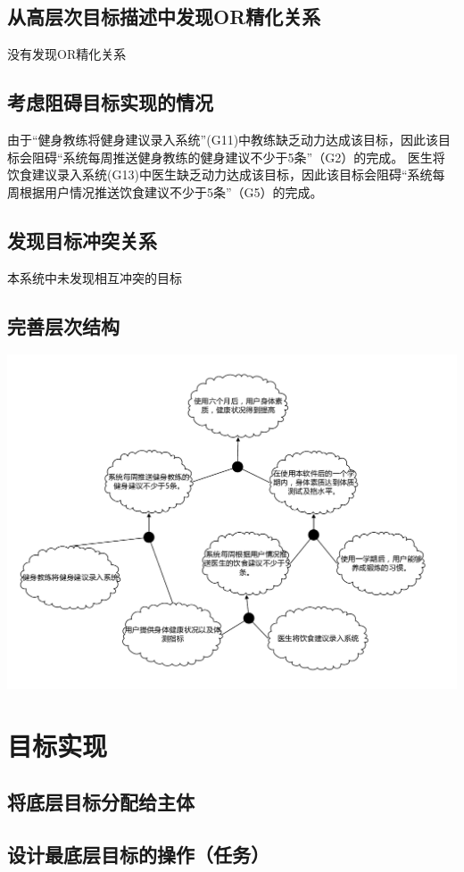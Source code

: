 \documentclass[UTF8]{ctexart}
\begin{document}
\subsection{从高层次目标描述中发现OR精化关系}
没有发现OR精化关系
\subsection{考虑阻碍目标实现的情况}
由于“健身教练将健身建议录入系统”(G11)中教练缺乏动力达成该目标，因此该目标会阻碍“系统每周推送健身教练的健身建议不少于5条”（G2）的完成。
医生将饮食建议录入系统(G13)中医生缺乏动力达成该目标，因此该目标会阻碍“系统每周根据用户情况推送饮食建议不少于5条”（G5）的完成。
\subsection{发现目标冲突关系}
本系统中未发现相互冲突的目标
\subsection{完善层次结构}

\includegraphics[scale=0.90]{goalModel.pdf}

\section{目标实现}
\subsection{将底层目标分配给主体}
\subsection{设计最底层目标的操作（任务）}
\end{document}
